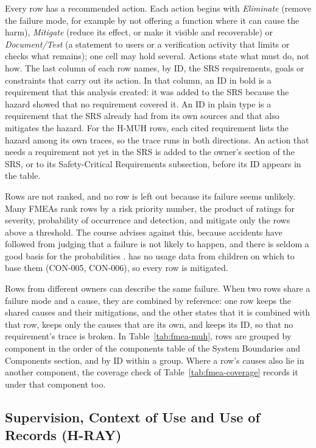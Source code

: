 \documentclass{article}
\begin{document}
Every row has a recommended action. Each action begins with \emph{Eliminate}
(remove the failure mode, for example by not offering a function where it can
cause the harm), \emph{Mitigate} (reduce its effect, or make it visible and
recoverable) or \emph{Document/Test} (a statement to users or a verification
activity that limits or checks what remains); one cell may hold several. Actions
state what \progname{} must do, not how. The last column of each row names, by
ID, the SRS requirements, goals or constraints that carry out its action. In
that column, an ID in bold is a requirement that this analysis created: it was
added to the SRS because the hazard showed that no requirement covered it. An ID
in plain type is a requirement that the SRS already had from its own sources and
that also mitigates the hazard. For
the H-MUH rows, each cited requirement lists the hazard among its own traces, so
the trace runs in both directions. An action that needs a requirement not yet in
the SRS is added to the owner's section of the SRS, or to its Safety-Critical
Requirements subsection, before its ID appears in the table.

Rows are not ranked, and no row is left out because its failure seems unlikely.
Many FMEAs rank rows by a risk priority number, the product of ratings for
severity, probability of occurrence and detection, and mitigate only the rows
above a threshold. The course advises against this, because accidents have
followed from judging that a failure is not likely to happen, and there is
seldom a good basis for the probabilities \citep{Smith2026L08}. \progname{} has
no usage data from children on which to base them (CON-005, CON-006), so every
row is mitigated.

Rows from different owners can describe the same failure. When two rows share a
failure mode and a cause, they are combined by reference: one row keeps the
shared causes and their mitigations, and the other states that it is combined
with that row, keeps only the causes that are its own, and keeps its ID, so that
no requirement's trace is broken. In Table~\ref{tab:fmea-muh}, rows are grouped
by component in the order of the components table of the System Boundaries and
Components section, and by ID within a group. Where a row's causes also lie in
another component, the coverage check of Table~\ref{tab:fmea-coverage} records
it under that component too.

\subsection{Supervision, Context of Use and Use of Records (H-RAY)}
\end{document}
